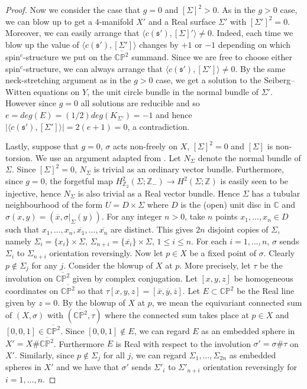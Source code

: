 \documentclass{amsart}
\theoremstyle{definition}
\theoremstyle{remark}
\numberwithin{equation}{section}
\begin{document}
\begin{proof}
Now we consider the case that $g=0$ and $[\Sigma]^2 > 0$. As in the $g>0$ case, we can blow up to get a $4$-manifold $X'$ and a Real surface $\Sigma'$ with $[\Sigma']^2 = 0$. Moreover, we can easily arrange that $\langle c(\mathfrak{s}') , [\Sigma]' \rangle \neq 0$. Indeed, each time we blow up the value of $\langle c(\mathfrak{s}') , [\Sigma'] \rangle$ changes by $+1$ or $-1$ depending on which spin$^c$-structure we put on the $\overline{\mathbb{CP}^2}$ summand. Since we are free to choose either spin$^c$-structure, we can always arrange that $\langle c(\mathfrak{s}') , [\Sigma'] \rangle \neq 0$. By the same neck-stretching argument as in the $g>0$ case, we get a solution to the Seiberg--Witten equations on $Y$, the unit circle bundle in the normal bundle of $\Sigma'$. However since $g=0$ all solutions are reducible and so $e = deg(E) = (1/2)deg(K_{\Sigma'}) = -1$ and hence $|\langle c(\mathfrak{s}') , [\Sigma'] \rangle | = 2(e+1) = 0$, a contradiction.

Lastly, suppose that $g=0$, $\sigma$ acts non-freely on $X$, $[\Sigma]^2 = 0$ and $[\Sigma]$ is non-torsion. We use an argument adapted from \cite[Lemma 5.1]{fs0}. Let $N_\Sigma$ denote the normal bundle of $\Sigma$. Since $[\Sigma]^2 = 0$, $N_\Sigma$ is trivial as an ordinary vector bundle. Furthermore, since $g=0$, the forgetful map $H^2_{\mathbb{Z}_2}( \Sigma ; \mathbb{Z}_-) \to H^2(\Sigma ; \mathbb{Z})$ is easily seen to be injective, hence $N_\Sigma$ is also trivial as a Real vector bundle. Hence $\Sigma$ has a tubular neighbourhood of the form $U = D \times \Sigma$ where $D$ is the (open) unit disc in $\mathbb{C}$ and $\sigma(x,y) = ( \overline{x} , \sigma|_\Sigma(y) )$. For any integer $n > 0$, take $n$ points $x_1, \dots , x_n \in D$ such that $x_1, \dots , x_n, \overline{x_1} , \dots, \overline{x_n}$ are distinct. This gives $2n$ disjoint copies of $\Sigma$, namely $\Sigma_i = \{x_i \} \times \Sigma$, $\Sigma_{n+i} = \{ \overline{x_i} \} \times \Sigma$, $1 \le i \le n$. For each $i = 1, \dots ,n$, $\sigma$ sends $\Sigma_i$ to $\Sigma_{n+i}$ orientation reversingly. Now let $p \in X$ be a fixed point of $\sigma$. Clearly $p \notin \Sigma_j$ for any $j$. Consider the blowup of $X$ at $p$. More precisely, let $\tau$ be the involution on $\overline{\mathbb{CP}^2}$ given by complex conjugation. Let $[x,y,z]$ be homogeneous coordinates on $\overline{\mathbb{CP}^2}$ so that $\tau[x,y,z] = [\overline{x},\overline{y},\overline{z}]$. Let $E \subset \overline{\mathbb{CP}^2}$ be the Real line given by $z=0$. By the blowup of $X$ at $p$, we mean the equivariant connected sum of $(X,\sigma)$ with $(\overline{\mathbb{CP}^2} , \tau)$ where the connected sum takes place at $p \in X$ and $[0,0,1] \in \overline{\mathbb{CP}^2}$. Since $[0,0,1] \notin E$, we can regard $E$ as an embedded sphere in $X' = X \# \overline{\mathbb{CP}^2}$. Furthermore $E$ is Real with respect to the involution $\sigma' = \sigma \# \tau$ on $X'$. Similarly, since $p \notin \Sigma_j$ for all $j$, we can regard $\Sigma_1, \dots , \Sigma_{2n}$ as embedded spheres in $X'$ and we have that $\sigma'$ sends $\Sigma'_i$ to $\Sigma'_{n+i}$ orientation reversingly for $i = 1, \dots , n$.


\end{proof}
\end{document}

